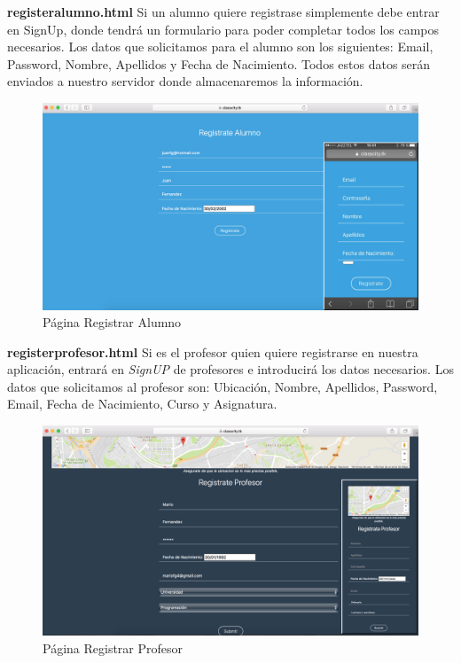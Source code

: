 \textbf{registeralumno.html} Si un alumno quiere registrase simplemente debe entrar en SignUp, donde tendrá un formulario para poder completar todos los campos necesarios. Los datos que solicitamos para el alumno son los siguientes: Email, Password, Nombre, Apellidos y Fecha de Nacimiento. Todos estos datos serán enviados a nuestro servidor donde almacenaremos la información.
\begin{figure}[!h]
    \centering
    \includegraphics[width=140mm]{img/templates/registeralumno.png}
    \caption{Página Registrar Alumno}
      \label{img:signupalumnoclasscity}
\end{figure}

\textbf{registerprofesor.html} Si es el profesor quien quiere registrarse en nuestra aplicación, entrará en \textit{SignUP} de profesores e introducirá los datos necesarios. Los datos que solicitamos al profesor son: Ubicación, Nombre, Apellidos, Password, Email, Fecha de Nacimiento, Curso y Asignatura.
\begin{figure}[!h]
    \centering
    \includegraphics[width=140mm]{img/templates/registerprofesor.png}
    \caption{Página Registrar Profesor}
    \label{img:signuprofesorclasscity}
\end{figure}

